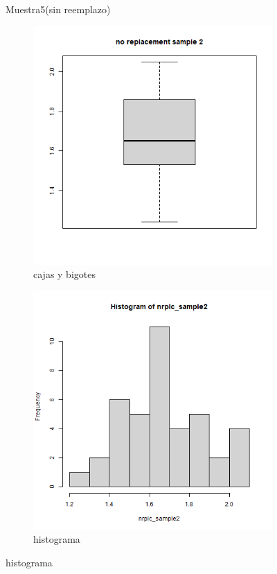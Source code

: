 \documentclass[a4paper,12pt]{article}
\begin{document}
\begin{enumerate}
\begin{figure}[t!]
    
    \caption{Muestra5(sin reemplazo)}
    \label{figure}
\end{figure}

\begin{figure}[t!]
    \centering
    \begin{subfigure}[b]{0.4\linewidth}             
        \includegraphics[width = \linewidth]{./datos generados (Ejercicio 1)/no_replacement_sample2_boxplot.png}
        \caption{cajas y bigotes}
    \end{subfigure}
    \begin{subfigure}[b]{0.4\linewidth}               
        \includegraphics[width = \linewidth]{./datos generados (Ejercicio 1)/no_replacement_sample2_hist.png}
        \caption{histograma}
    \end{subfigure}


\end{figure}
\end{enumerate}
\end{document}
